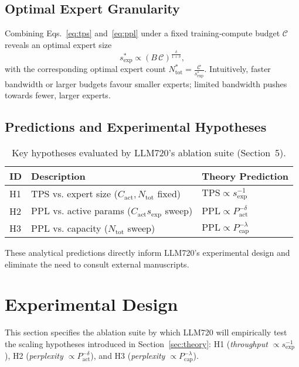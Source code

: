 \documentclass[11pt]{article}
\begin{document}
\subsection{Optimal Expert Granularity}
Combining Eqs.~\eqref{eq:tps} and~\eqref{eq:ppl} under a fixed training‑compute budget $\mathcal{C}$
reveals an optimal expert size
\begin{equation}
s_{\mathrm{exp}}^* \propto (B\,\mathcal{C})^{\frac{\delta}{1+\delta}},
\end{equation}
with the corresponding optimal expert count $N_{\mathrm{tot}}^* = \tfrac{\mathcal{C}}{s_{\mathrm{exp}}^*}$.
Intuitively, faster bandwidth or larger budgets favour smaller experts; limited bandwidth
pushes towards fewer, larger experts.

\subsection{Predictions and Experimental Hypotheses}
\begin{table}[ht]
  \centering
  \begin{tabular}{lll}
    \toprule
    ID & Description & Theory Prediction \\
    \midrule
    H1 & TPS vs. expert size ($C_{\mathrm{act}},N_{\mathrm{tot}}$ fixed) & $\mathrm{TPS}\propto s_{\mathrm{exp}}^{-1}$ \\
    H2 & PPL vs. active params ($C_{\mathrm{act}} s_{\mathrm{exp}}$ sweep) & $\mathrm{PPL}\propto P_{\mathrm{act}}^{-\delta}$ \\
    H3 & PPL vs. capacity ($N_{\mathrm{tot}}$ sweep) & $\mathrm{PPL}\propto P_{\mathrm{cap}}^{-\lambda}$ \\
    \bottomrule
  \end{tabular}
  \caption{Key hypotheses evaluated by LLM720's ablation suite (Section~5).}
\end{table}

These analytical predictions directly inform LLM720's experimental design and eliminate
the need to consult external manuscripts.

\section{Experimental Design}\label{sec:experiments}

This section specifies the ablation suite by which \textsc{LLM720} will
empirically test the scaling hypotheses introduced in
Section~\ref{sec:theory}:  
H1 (\emph{throughput $\propto s_{\mathrm{exp}}^{-1}$}),  
H2 (\emph{perplexity $\propto P_{\mathrm{act}}^{-\delta}$}), and  
H3 (\emph{perplexity $\propto P_{\mathrm{cap}}^{-\lambda}$}).
\end{document}
